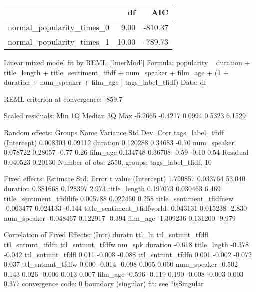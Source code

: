 \begin{table}[ht]
\centering
\begin{tabular}{rrr}
  \hline
 & df & AIC \\ 
  \hline
normal\_popularity\_times\_0 & 9.00 & -810.37 \\ 
  normal\_popularity\_times\_1 & 10.00 & -789.73 \\ 
   \hline
\end{tabular}
\end{table}
Linear mixed model fit by REML ['lmerMod']
Formula: popularity ~ duration + title_length + title_sentiment_tfidf +  
    num_speaker + film_age + (1 + duration + num_speaker + film_age |      tags_label_tfidf)
   Data: df

REML criterion at convergence: -859.7

Scaled residuals: 
    Min      1Q  Median      3Q     Max 
-5.2665 -0.4217  0.0994  0.5323  6.1529 

Random effects:
 Groups           Name        Variance Std.Dev. Corr             
 tags_label_tfidf (Intercept) 0.008303 0.09112                   
                  duration    0.120288 0.34683  -0.70            
                  num_speaker 0.078722 0.28057  -0.77  0.26      
                  film_age    0.134748 0.36708  -0.59 -0.10  0.54
 Residual                     0.040523 0.20130                   
Number of obs: 2550, groups:  tags_label_tfidf, 10

Fixed effects:
                            Estimate Std. Error t value
(Intercept)                 1.790857   0.033764  53.040
duration                    0.381668   0.128397   2.973
title_length                0.197073   0.030463   6.469
title_sentiment_tfidflife   0.005788   0.022460   0.258
title_sentiment_tfidfnew   -0.003477   0.024133  -0.144
title_sentiment_tfidfworld -0.043131   0.015238  -2.830
num_speaker                -0.048467   0.122917  -0.394
film_age                   -1.309236   0.131200  -9.979

Correlation of Fixed Effects:
                 (Intr) duratn ttl_ln ttl_sntmnt_tfdfl ttl_sntmnt_tfdfn ttl_sntmnt_tfdfw nm_spk
duration         -0.618                                                                        
title_lngth      -0.378 -0.042                                                                 
ttl_sntmnt_tfdfl  0.011 -0.008 -0.088                                                          
ttl_sntmnt_tfdfn  0.001 -0.002 -0.072  0.037                                                   
ttl_sntmnt_tfdfw  0.000 -0.014 -0.098  0.065            0.060                                  
num_speaker      -0.502  0.143  0.026 -0.006            0.013            0.007                 
film_age         -0.596 -0.119  0.190 -0.008           -0.003            0.003            0.377
convergence code: 0
boundary (singular) fit: see ?isSingular

